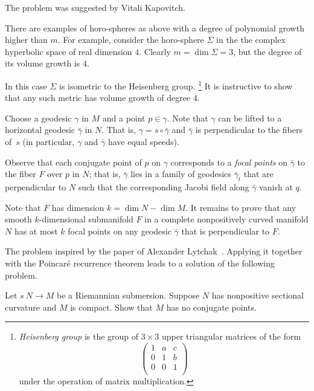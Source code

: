 The problem was suggested by Vitali Kapovitch.

There are examples of horo-spheres as above with a degree of polynomial growth higher than $m$.
For example, consider the horo-sphere $\Sigma$ in the
the complex hyperbolic space 
of real dimension $4$.
Clearly $m=\dim \Sigma=3$, but the degree of its volume growth is $4$.

In this case $\Sigma$ is isometric to the Heisenberg group.%
\footnote{\emph{Heisenberg group}
is the group of $3\times3$ upper triangular matrices of the form
\[\begin{pmatrix}
 1 & a & c\\
 0 & 1 & b\\
 0 & 0 & 1\\
\end{pmatrix}\]
under the operation of matrix multiplication.} 
It is instructive to show that any such metric has volume  growth of degree $4$.

Choose a geodesic $\gamma$ in $M$ and a point $p\in \gamma$.
Note that $\gamma$ can be lifted to a horizontal geodesic $\bar\gamma$ in $N$.
That is, $\gamma=s\circ\bar\gamma$ and $\bar\gamma$ is perpendicular to the fibers of~$s$ (in particular, $\gamma$ and $\bar\gamma$ have equal speeds).

Observe that each conjugate point of $p$ on $\gamma$ corresponds to a \emph{focal points} on $\bar\gamma$ to the fiber $F$ over $p$ in $N$;
that is, $\bar\gamma$ lies in a family of geodesics $\bar\gamma_t$ that are perpendicular to $N$ 
such that the corresponding Jacobi field along $\bar\gamma$ vanish at $q$.

Note that $F$ has dimension $k=\dim N-\dim M$.
It remains to prove that any smooth $k$-dimensional submanifold $F$ in a complete nonpositively curved manifold $N$ has at most $k$ focal points on any geodesic $\bar \gamma$ that is perpendicular to $F$.\qeds

The problem inspired by the paper of Alexander Lytchak~\cite{lytchak:conjugate}.
Applying it together with the Poincar\'e recurrence theorem
leads to a solution of the following problem.

\begin{pr}
Let $s\:N\to M$ be a Riemannian submersion.
Suppose $N$ has nonpositive sectional curvature and $M$ is compact.
Show that $M$ has no conjugate points.
\end{pr}

